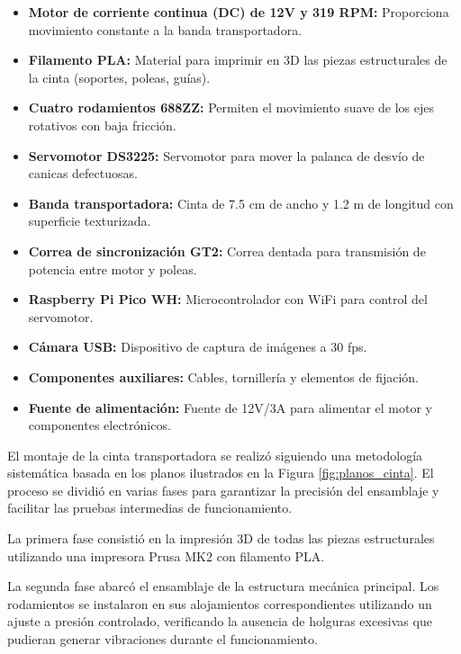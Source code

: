 \documentclass[11pt,spanish,listoffigures,listoftables]{tfgetsinf}
\begin{document}
\begin{itemize}
   \item \textbf{Motor de corriente continua (DC) de 12V y 319 RPM:} Proporciona movimiento constante a la banda transportadora.
   
   \item \textbf{Filamento PLA:} Material para imprimir en 3D las piezas estructurales de la cinta (soportes, poleas, guías).
   
   \item \textbf{Cuatro rodamientos 688ZZ:} Permiten el movimiento suave de los ejes rotativos con baja fricción.
   
   \item \textbf{Servomotor DS3225:} Servomotor para mover la palanca de desvío de canicas defectuosas.
   
   \item \textbf{Banda transportadora:} Cinta de 7.5 cm de ancho y 1.2 m de longitud con superficie texturizada.
   
   \item \textbf{Correa de sincronización GT2:} Correa dentada para transmisión de potencia entre motor y poleas.
   
   \item \textbf{Raspberry Pi Pico WH:} Microcontrolador con WiFi para control del servomotor.
   
   \item \textbf{Cámara USB:} Dispositivo de captura de imágenes a 30 fps.

   \item \textbf{Componentes auxiliares:} Cables, tornillería y elementos de fijación.
   
   \item \textbf{Fuente de alimentación:} Fuente de 12V/3A para alimentar el motor y componentes electrónicos.
\end{itemize}

El montaje de la cinta transportadora se realizó siguiendo una metodología sistemática basada en los planos ilustrados en la Figura \ref{fig:planos_cinta}. El proceso se dividió en varias fases para garantizar la precisión del ensamblaje y facilitar las pruebas intermedias de funcionamiento.

La primera fase consistió en la impresión 3D de todas las piezas estructurales utilizando una impresora Prusa MK2\cite{prusa3d_mk2_mk2s} con filamento PLA.

La segunda fase abarcó el ensamblaje de la estructura mecánica principal. Los rodamientos se instalaron en sus alojamientos correspondientes utilizando un ajuste a presión controlado, verificando la ausencia de holguras excesivas que pudieran generar vibraciones durante el funcionamiento.
\end{document}
